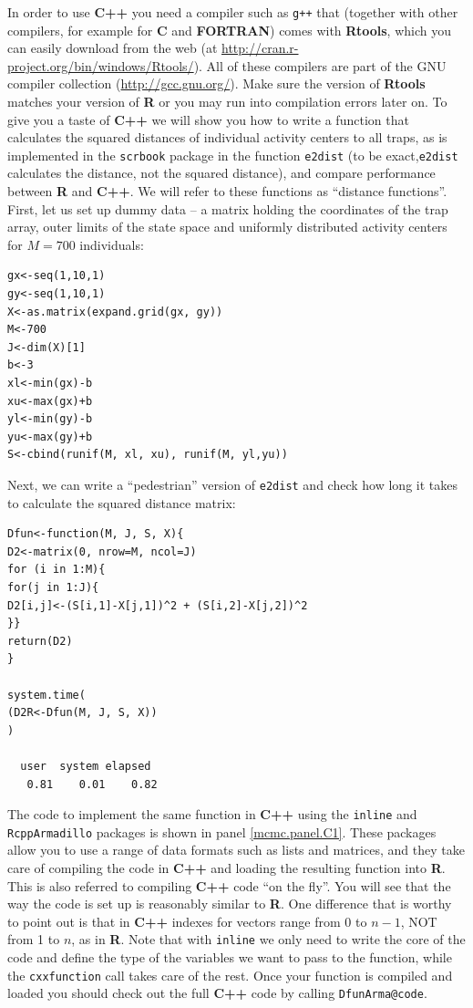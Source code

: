In order to use {\bf C++} you need a compiler such as \verb!g++!
that (together with other compilers, for example for {\bf C} and {\bf FORTRAN}) comes with {\bf Rtools}, which you can easily download from the web (at \url{http://cran.r-project.org/bin/windows/Rtools/}). All of these compilers are part of the GNU compiler collection (\url{http://gcc.gnu.org/}). Make sure the version of {\bf Rtools} matches your version of {\bf R} or you may run into compilation errors later on.
To give you a taste of {\bf C++} we will show you how to write a function that calculates the squared distances of individual activity centers to all traps, as is implemented in the {\tt scrbook} package in the function {\tt e2dist} (to be exact,{\tt e2dist} calculates the distance, not the squared distance), and compare performance between {\bf R} and {\bf C++}. We will refer to these functions as ``distance functions''. First, let us set up dummy data --  a matrix holding the coordinates of the trap array, outer limits of the state space and uniformly distributed activity centers for $M=700$ individuals:
{\small
\begin{verbatim}
gx<-seq(1,10,1)
gy<-seq(1,10,1)
X<-as.matrix(expand.grid(gx, gy))
M<-700
J<-dim(X)[1]
b<-3
xl<-min(gx)-b
xu<-max(gx)+b
yl<-min(gy)-b
yu<-max(gy)+b
S<-cbind(runif(M, xl, xu), runif(M, yl,yu))
\end{verbatim}
}
Next, we can write a ``pedestrian'' version of {\tt e2dist} and check how long it takes to calculate the squared distance matrix:
{\small
\begin{verbatim}
Dfun<-function(M, J, S, X){
D2<-matrix(0, nrow=M, ncol=J)
for (i in 1:M){
for(j in 1:J){
D2[i,j]<-(S[i,1]-X[j,1])^2 + (S[i,2]-X[j,2])^2
}}
return(D2)
}

system.time(
(D2R<-Dfun(M, J, S, X))
)

  user  system elapsed
   0.81    0.01    0.82
\end{verbatim}
}
The code to implement the same function in {\bf C++}
using the {\tt inline} and {\tt RcppArmadillo} packages is shown in panel \ref{mcmc.panel.C1}. These packages allow you to use a range of data formats such as lists and matrices, and they take care of compiling the code in {\bf C++} and loading the resulting function into {\bf R}. This is also referred to compiling {\bf C++} code ``on the fly''. You will see that the way the code is set up is reasonably similar to {\bf R}. One difference that is worthy to point out is that in {\bf C++} indexes for vectors range from 0 to $n-1$, NOT from 1 to $n$, as in {\bf R}. Note that with {\tt inline} we only need to write the core of the code and define the type of the variables we want to pass to the function, while the {\tt cxxfunction} call takes care of the rest. Once your function is compiled and loaded you should check out the full {\bf C++} code by calling {\tt DfunArma@code}.

